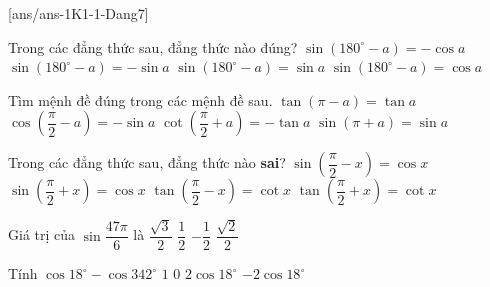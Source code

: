 \centerline{}
[ans/ans-1K1-1-Dang7]
\begin{ex}%
	Trong các đẳng thức sau, đẳng thức nào đúng?
	\choice
	{$\sin\left(180^\circ-a\right)=-\cos a$}
	{$\sin\left(180^\circ-a\right)=-\sin a$}
	{\True $\sin\left(180^\circ-a\right)=\sin a$}
	{$\sin\left(180^\circ-a\right)=\cos a$}
\end{ex}

\begin{ex}%
	Tìm mệnh đề đúng trong các mệnh đề sau.
	\choice
	{$\tan \left(\pi - a\right)=\tan a$}
	{$\cos \left(\dfrac{\pi}{2} - a\right)=-\sin a$}
	{\True $\cot \left(\dfrac{\pi}{2} + a\right)=-\tan a$}
	{$\sin\left(\pi + a\right)= \sin a$}
\end{ex}

\begin{ex}%
	Trong các đẳng thức sau, đẳng thức nào \textbf{sai}?
	\choice
	{$\sin\left(\dfrac{\pi}{2}-x\right)=\cos x$}
	{$\sin\left(\dfrac{\pi}{2}+x\right)=\cos x$}
	{$\tan\left(\dfrac{\pi}{2}-x\right)=\cot x$}
	{\True $\tan\left(\dfrac{\pi}{2}+x\right)=\cot x$}
\end{ex}

\begin{ex}%
	Giá trị của $\sin \dfrac{47\pi}{6}$ là
	\choice
	{$\dfrac{\sqrt{3}}{2}$}
	{$\dfrac{1}{2}$}
	{\True $-\dfrac{1}{2}$}
	{$\dfrac{\sqrt{2}}{2}$}
\end{ex}

\begin{ex}%
	Tính $\cos 18^{\circ}-\cos 342^{\circ}$
	\choice
	{$1$}
	{\True $0$}
	{$2\cos 18^{\circ}$}
	{$-2\cos 18^{\circ}$}
\end{ex}

